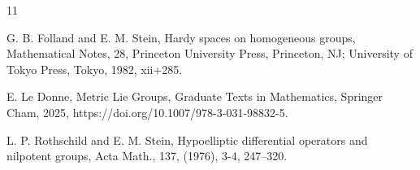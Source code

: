 \documentclass[12pt]{amsart}
\begin{document}
\begin{thebibliography}{11}

  {G. B. Folland and E. M. Stein},
     {Hardy spaces on homogeneous groups},
    {Mathematical Notes},
   {28},
 {Princeton University Press, Princeton, NJ; University of Tokyo
              Press, Tokyo},
     {1982},
    {xii+285.}
     
E. Le Donne,
{Metric Lie Groups},
Graduate Texts in Mathematics,
Springer Cham, 
2025,
https://doi.org/10.1007/978-3-031-98832-5.










    {L. P. Rothschild and E. M. Stein},
   {Hypoelliptic differential operators and nilpotent groups},
   {Acta Math.},
  {137},
      {(1976)},
    {3-4},
    {247--320.}

\end{thebibliography}
\end{document}
